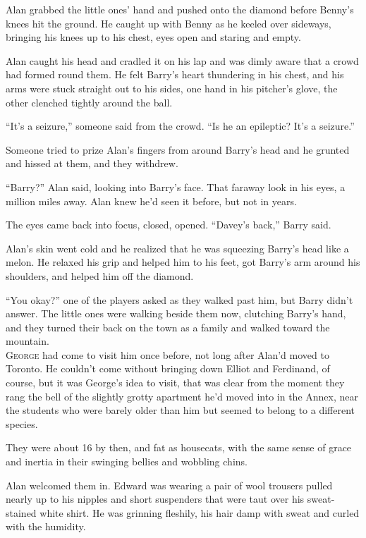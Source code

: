 Alan grabbed the little ones' hand and pushed onto the diamond before
Benny's knees hit the ground.  He caught up with Benny as he keeled
over sideways, bringing his knees up to his chest, eyes open and
staring and empty.

Alan caught his head and cradled it on his lap and was dimly aware
that a crowd had formed round them.  He felt Barry's heart thundering
in his chest, and his arms were stuck straight out to his sides, one
hand in his pitcher's glove, the other clenched tightly around the
ball.

``It's a seizure,'' someone said from the crowd.  ``Is he an
epileptic?  It's a seizure.''

Someone tried to prize Alan's fingers from around Barry's head and he
grunted and hissed at them, and they withdrew.

``Barry?'' Alan said, looking into Barry's face.  That faraway look in
his eyes, a million miles away.  Alan knew he'd seen it before, but
not in years.

The eyes came back into focus, closed, opened.  ``Davey's back,''
Barry said.

Alan's skin went cold and he realized that he was squeezing Barry's
head like a melon.  He relaxed his grip and helped him to his feet,
got Barry's arm around his shoulders, and helped him off the diamond.

``You okay?'' one of the players asked as they walked past him, but
Barry didn't answer.  The little ones were walking beside them now,
clutching Barry's hand, and they turned their back on the town as a
family and walked toward the mountain.
\\
\lettrine[lines=3, lhang=.5, nindent=0pt, findent=2pt]{G}{eorge} had come to visit him once before, not long after Alan'd moved
to Toronto.  He couldn't come without bringing down Elliot and
Ferdinand, of course, but it was George's idea to visit, that was
clear from the moment they rang the bell of the slightly grotty
apartment he'd moved into in the Annex, near the students who were
barely older than him but seemed to belong to a different species.

They were about 16 by then, and fat as housecats, with the same sense
of grace and inertia in their swinging bellies and wobbling chins.

Alan welcomed them in.  Edward was wearing a pair of wool trousers
pulled nearly up to his nipples and short suspenders that were taut
over his sweat-stained white shirt.  He was grinning fleshily, his
hair damp with sweat and curled with the humidity.

